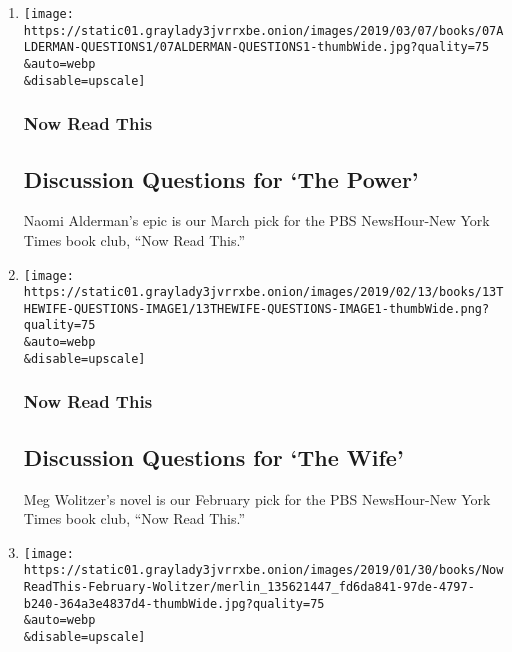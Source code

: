 \begin{enumerate}
\def\labelenumi{\arabic{enumi}.}
\item
  \href{/2019/03/07/books/discussion-questions-for-the-power-by-naomi-alderman.html}{}

  \texttt{[image: https://static01.graylady3jvrrxbe.onion/images/2019/03/07/books/07ALDERMAN-QUESTIONS1/07ALDERMAN-QUESTIONS1-thumbWide.jpg?quality=75\\\&auto=webp\\\&disable=upscale]}

  \hypertarget{now-read-this-2}{%
  \subsubsection{Now Read This}\label{now-read-this-2}}

  \hypertarget{discussion-questions-for-the-power}{%
  \subsection{Discussion Questions for `The
  Power'}\label{discussion-questions-for-the-power}}

  Naomi Alderman's epic is our March pick for the PBS NewsHour-New York
  Times book club, ``Now Read This.''
\item
  \href{/2019/02/13/books/discussion-questions-for-the-wife.html}{}

  \texttt{[image: https://static01.graylady3jvrrxbe.onion/images/2019/02/13/books/13THEWIFE-QUESTIONS-IMAGE1/13THEWIFE-QUESTIONS-IMAGE1-thumbWide.png?quality=75\\\&auto=webp\\\&disable=upscale]}

  \hypertarget{now-read-this-3}{%
  \subsubsection{Now Read This}\label{now-read-this-3}}

  \hypertarget{discussion-questions-for-the-wife}{%
  \subsection{Discussion Questions for `The
  Wife'}\label{discussion-questions-for-the-wife}}

  Meg Wolitzer's novel is our February pick for the PBS NewsHour-New
  York Times book club, ``Now Read This.''
\item
  \href{/2019/01/30/books/februarys-book-club-pick-the-wife-by-meg-wolitzer.html}{}

  \texttt{[image: https://static01.graylady3jvrrxbe.onion/images/2019/01/30/books/NowReadThis-February-Wolitzer/merlin\_135621447\_fd6da841-97de-4797-b240-364a3e4837d4-thumbWide.jpg?quality=75\\\&auto=webp\\\&disable=upscale]}


\end{enumerate}
